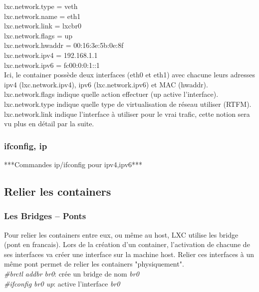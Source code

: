\documentclass[twoside]{article}
\begin{document}
\noindent
lxc.network.type = veth\\
lxc.network.name = eth1\\
lxc.network.link = lxcbr0\\
lxc.network.flags = up\\
lxc.network.hwaddr = 00:16:3e:5b:0e:8f\\
lxc.network.ipv4 = 192.168.1.1\\
lxc.network.ipv6 = fc00:0:0:1::1\\

Ici, le container poss\`ede deux interfaces (eth0 et eth1) avec chacune leurs adresses ipv4 (lxc.network.ipv4),
ipv6 (lxc.network.ipv6) et MAC (hwaddr).\\
lxc.network.flags indique quelle action effectuer (up active l'interface).\\
lxc.network.type indique quelle type de virtualisation de réseau utiliser (RTFM).\\
lxc.network.link indique l'interface \`a utiliser pour le vrai trafic, cette notion sera vu plus en d\'etail par la suite.\\

\subsubsection{ifconfig, ip}

***Commandes ip/ifconfig pour ipv4,ipv6***

\subsection{Relier les containers}
\subsubsection{Les Bridges -- Ponts}

Pour relier les containers entre eux, ou m\^eme au host, LXC utilise les bridge (pont en francais). Lors de
la cr\'eation d'un container, l'activation de chacune de ses interfaces va cr\'eer une interface sur la machine
host. Relier ces interfaces \`a un m\^eme pont permet de relier les containers "physiquement".\\

\noindent
\emph{\#brctl addbr br0}: cr\'ee un bridge de nom \emph{br0}\\
\emph{\#ifconfig br0 up}: active l'interface \emph{br0}
\end{document}
